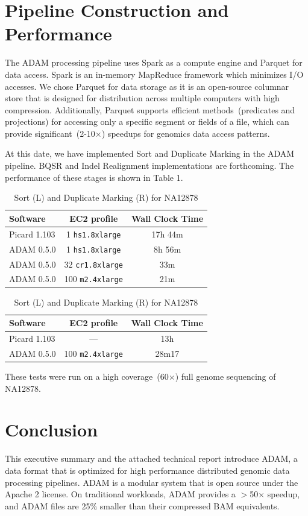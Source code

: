 \documentclass[10pt]{article}
\begin{document}
\section{Pipeline Construction and Performance}

The ADAM processing pipeline uses Spark as a compute engine and Parquet for data access. Spark is an in-memory MapReduce framework
which minimizes I/O accesses. We chose Parquet for data storage as it is an open-source columnar store that is designed for distribution across
multiple computers with high compression. Additionally, Parquet supports efficient methods~(predicates and projections) for accessing only a
specific segment or fields of a file, which can provide significant~(2-10$\times$) speedups for genomics data access patterns.

At this date, we have implemented Sort and Duplicate Marking in the ADAM pipeline. BQSR and Indel Realignment implementations are
forthcoming. The performance of these stages is shown in Table 1.

\begin{table}[h]
\small
\caption{Sort (L) and Duplicate Marking (R) for NA12878}
\begin{center}
\begin{tabular}{| l | c | c |}
\hline
\bf Software & \bf EC2 profile & \bf Wall Clock Time \\
\hline
\hline
Picard 1.103 & 1 \texttt{hs1.8xlarge} & 17h 44m \\
ADAM 0.5.0 & 1 \texttt{hs1.8xlarge} & 8h 56m \\
ADAM 0.5.0 & 32 \texttt{cr1.8xlarge} & 33m \\
ADAM 0.5.0 & 100 \texttt{m2.4xlarge} & 21m \\ 
\hline
\end{tabular}
\begin{tabular}{| l | c | c |}
\hline
\bf Software & \bf EC2 profile & \bf Wall Clock Time \\
\hline
\hline
Picard 1.103 & --- & 13h \\
ADAM 0.5.0 & 100 \texttt{m2.4xlarge} & 28m17 \\
\hline
\end{tabular}
\end{center}
\end{table}

\noindent These tests were run on a high coverage~(60$\times$) full genome sequencing of NA12878.

\section{Conclusion}

This executive summary and the attached technical report introduce ADAM, a data format that is optimized for high performance
distributed genomic data processing pipelines. ADAM is a modular system that is open source under the Apache 2 license. On
traditional workloads, ADAM provides a $>$50$\times$ speedup, and ADAM files are 25\% smaller than their compressed BAM
equivalents.

\footnotesize




\end{document}
